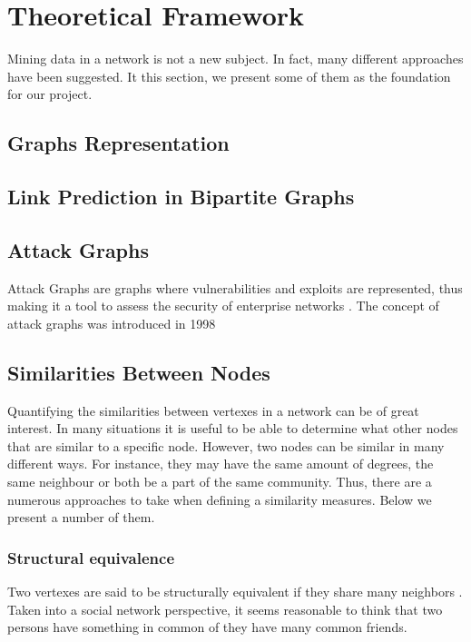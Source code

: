 \chapter{Theoretical Framework}
Mining data in a network is not a new subject. In fact, many different approaches have been suggested. It this section, we present some of them as the foundation for our project.

\section{Graphs Representation}


\section{Link Prediction in Bipartite Graphs}


\section{Attack Graphs}
Attack Graphs are graphs where vulnerabilities and exploits are represented, thus making it a tool to assess the security of enterprise networks \cite{barik2016}. The concept of attack graphs was introduced in 1998 

\section{Similarities Between Nodes \label{sim}}
Quantifying the similarities between vertexes in a network can be of great interest. In many situations it is useful to be able to determine what other nodes that are similar to a specific node. However, two nodes can be similar in many different ways. For instance, they may have the same amount of degrees, the same neighbour or both be a part of the same community. Thus, there are a numerous approaches to take when defining a similarity measures. Below we present a number of them. 

\subsection{Structural equivalence}
Two vertexes are said to be structurally equivalent if they share many neighbors \cite{leicht2006}. Taken into a social network perspective, it seems reasonable to think that two persons have something in common of they have many common friends. 

